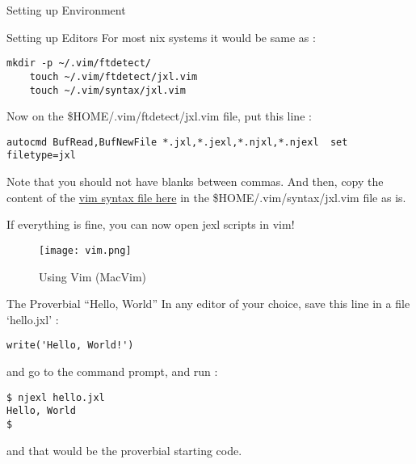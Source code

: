 \begin{section}{Setting up Environment}
\begin{subsection}{Setting up Editors}
For most \*nix systems it would be same as :

\begin{lstlisting}[style=all]
    mkdir -p ~/.vim/ftdetect/
    touch ~/.vim/ftdetect/jxl.vim 
    touch ~/.vim/syntax/jxl.vim 
\end{lstlisting}

Now on the \$HOME/.vim/ftdetect/jxl.vim  file, put this line :

\begin{lstlisting}[style=all]
    autocmd BufRead,BufNewFile *.jxl,*.jexl,*.njxl,*.njexl  set filetype=jxl
\end{lstlisting}

Note that you should not have blanks between commas.
And then, copy the content of the \href{https://github.com/nmondal/njexl/blob/master/doc/jxl.vim}{vim syntax file here} 
in the \$HOME/.vim/syntax/jxl.vim file as is.

If everything is fine, you can now open jexl scripts in vim!

\begin{figure}
\begin{center}
\leavevmode
\texttt{[image: vim.png]}
\end{center}
\caption{Using Vim (MacVim)}
\label{fig_2_1}
\end{figure}

\end{subsection} 

\begin{subsection}{The Proverbial ``Hello, World''}
In any editor of your choice, save this line in a file `hello.jxl' :
\begin{lstlisting}[style=JexlStyle]
write('Hello, World!')
\end{lstlisting}
and go to the command prompt, and run :
\begin{lstlisting}[style=all]
$ njexl hello.jxl
Hello, World
$
\end{lstlisting}
and that would be the proverbial starting code.
\end{subsection} 

\end{section}




